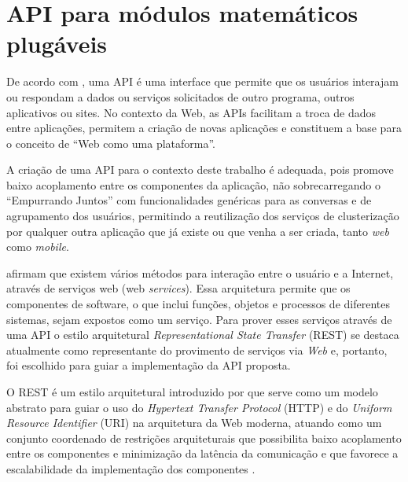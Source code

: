 \chapter{API para módulos matemáticos plugáveis} \label{cap:proposta}

De acordo com , uma API é uma interface que permite que os 
usuários interajam ou respondam a dados ou serviços solicitados de outro programa, outros
aplicativos ou sites. No contexto da Web, as APIs facilitam a troca de dados entre 
aplicações, permitem a criação de novas aplicações e constituem a base para o conceito de 
``Web como uma plataforma''.

A criação de uma API para o contexto deste trabalho é adequada, pois promove baixo acoplamento
entre os componentes da aplicação, não sobrecarregando o ``Empurrando Juntos'' com funcionalidades genéricas
para as conversas e de agrupamento dos usuários,
permitindo a reutilização dos serviços de clusterização por qualquer
outra aplicação que já existe ou que venha a ser criada, tanto \textit{web} como \textit{mobile}.

 afirmam que existem vários métodos para interação entre o  
usuário e a Internet, através de serviços web (web \textit{services}).
Essa arquitetura permite que os componentes de software, o que inclui funções,
objetos e processos de diferentes sistemas, sejam expostos como um serviço.
Para prover esses serviços através de uma API o estilo arquitetural \textit{Representational State Transfer} (REST)
se destaca atualmente como representante do provimento de serviços via \textit{Web} e, portanto, foi escolhido para
guiar a implementação da API proposta.

O REST é um estilo arquitetural introduzido por  que serve como um modelo abstrato
para guiar o uso do \textit{Hypertext Transfer Protocol} (HTTP) e do \textit{Uniform Resource Identifier} (URI)
na arquitetura da Web moderna, atuando como um conjunto coordenado de restrições arquiteturais que possibilita baixo acoplamento 
entre os componentes e minimização da latência da comunicação e que favorece a escalabilidade
da implementação dos componentes \cite{fielding2002}.

% 

